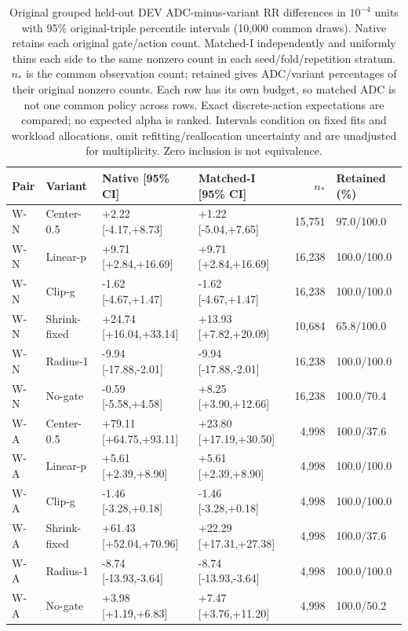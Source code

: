 \begin{table}[htbp]
\centering\footnotesize\setlength{\tabcolsep}{3pt}
\caption{Original grouped held-out DEV ADC-minus-variant RR differences in $10^{-4}$ units with 95\% original-triple percentile intervals (10,000 common draws). Native retains each original gate/action count. Matched-I independently and uniformly thins each side to the same nonzero count in each seed/fold/repetition stratum. $n_*$ is the common observation count; retained gives ADC/variant percentages of their original nonzero counts. Each row has its own budget, so matched ADC is not one common policy across rows. Exact discrete-action expectations are compared; no expected alpha is ranked. Intervals condition on fixed fits and workload allocations, omit refitting/reallocation uncertainty and are unadjusted for multiplicity. Zero inclusion is not equivalence.}
\label{tab:component-effects_dev_oof}
\begin{tabular}{llllrl}
\toprule
Pair & Variant & Native [95\% CI] & Matched-I [95\% CI] & $n_*$ & Retained (\%)\\
\midrule
W-N & Center-0.5 & +2.22 [-4.17,+8.73] & +1.22 [-5.04,+7.65] & 15,751 & 97.0/100.0\\
W-N & Linear-p & +9.71 [+2.84,+16.69] & +9.71 [+2.84,+16.69] & 16,238 & 100.0/100.0\\
W-N & Clip-g & -1.62 [-4.67,+1.47] & -1.62 [-4.67,+1.47] & 16,238 & 100.0/100.0\\
W-N & Shrink-fixed & +24.74 [+16.04,+33.14] & +13.93 [+7.82,+20.09] & 10,684 & 65.8/100.0\\
W-N & Radius-1 & -9.94 [-17.88,-2.01] & -9.94 [-17.88,-2.01] & 16,238 & 100.0/100.0\\
W-N & No-gate & -0.59 [-5.58,+4.58] & +8.25 [+3.90,+12.66] & 16,238 & 100.0/70.4\\
W-A & Center-0.5 & +79.11 [+64.75,+93.11] & +23.80 [+17.19,+30.50] & 4,998 & 100.0/37.6\\
W-A & Linear-p & +5.61 [+2.39,+8.90] & +5.61 [+2.39,+8.90] & 4,998 & 100.0/100.0\\
W-A & Clip-g & -1.46 [-3.28,+0.18] & -1.46 [-3.28,+0.18] & 4,998 & 100.0/100.0\\
W-A & Shrink-fixed & +61.43 [+52.04,+70.96] & +22.29 [+17.31,+27.38] & 4,998 & 100.0/37.6\\
W-A & Radius-1 & -8.74 [-13.93,-3.64] & -8.74 [-13.93,-3.64] & 4,998 & 100.0/100.0\\
W-A & No-gate & +3.98 [+1.19,+6.83] & +7.47 [+3.76,+11.20] & 4,998 & 100.0/50.2\\

\end{tabular}
\end{table}
